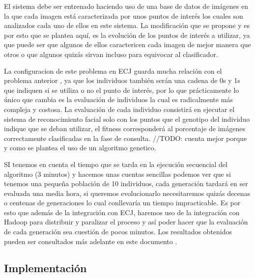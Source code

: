 El sistema debe ser entrenado haciendo uso de una base de datos de imágenes en la que cada imagen est\'a caracterizada por unos puntos de interés los cuales son analizados cada uno de ellos en este sistema. La modificación que se propone y es por esto que se plantea aquí, es la evolución de los puntos de interés a utilizar, ya que puede ser que algunos de ellos caractericen cada imagen de mejor manera que otros o que algunos quizás sirvan incluso para equivocar al clasificador.

La configuracion de este problema en ECJ guarda mucha relación con el problema anterior , ya que los individuos también serán una cadena de 0s y 1s que indiquen si se utiliza o no el punto de interés, por lo que prácticamente lo único que cambia es la evaluación de individuos la cual es radicalmente m\'as compleja y costosa. La evaluación de cada individuo consistirá en ejecutar el sistema de reconocimiento facial solo con los puntos que el genotipo del individuo indique que se deban utilizar, el fitness corresponderá al porcentaje de imágenes correctamente clasificadas en la fase de consulta.
//TODO: cuenta mejor porque y como se plantea el uso de un algoritmo genetico.

SI tenemos en cuenta el tiempo que se tarda en la ejecución secuencial del algoritmo (3 minutos) y hacemos unas cuentas sencillas podemos ver que si tenemos una peque\~na población de 10 individuos, cada generación tardar\'a en ser evaluada una media hora, si queremos evolucionarlo necesitaremos quizás decenas o centenas de generaciones lo cual conllevar\'ia un tiempo impracticable. Es por esto que adem\'as de la integración con ECJ, haremos uso de la integración con Hadoop para distribuir y paralizar el proceso y así poder hacer que la evaluación de cada generación sea cuestión de pocos minutos. Los resultados obtenidos pueden ser consultados m\'as adelante en este documento .

\subsection{Implementaci\'on} \label{problema-facerecognition-implementacion}

